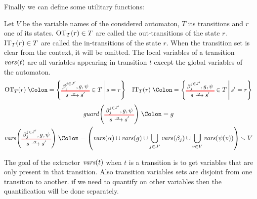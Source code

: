 \documentclass{article}
\begin{document}
Finally we can define some utilitary functions:
\begin{defi}
Let \(V\) be the variable names of the considered automaton, \(T\) its transitions and \(r\) one of its states.
\(\fOT[T]{r} \in T\) are called the out-transitions of the state \(r\).
\(\fIT[T]{r} \in T\) are called the in-transitions of the state \(r\).
When the transition set is clear from the context, it will be omitted.
The local variables of a transition \(\fvars{t}\) are all variables appearing in transition \(t\) except the global variables of the automaton.
\begin{align*}
	\fOT[T]{r} & \defnotation \mset{\OTg \in T}{s = r} &
	\fIT[T]{r} & \defnotation \mset{\OTg \in T}{s' = r} \\
\end{align*}
\vspace{-1cm}
\begin{gather*}
	\fguard{\OTg} \defnotation g \\
	\fvars{\OTg} \defnotation \mpar{\fvars{\alpha} \cup \fvars{g} \cup \bigcup_{j \in J'} \fvars{\beta_j} \cup \bigcup_{v \in V} \fvars{\psi\mpar{v}}} \setminus V
\end{gather*}
\end{defi}
The goal of the extractor \(\fvars{t}\) when \(t\) is a transition is to get variables that are only present in that transition.
Also transition variables sets are disjoint from one transition to another.
if we need to quantify on other variables then the quantification will be done separately.
\end{document}
